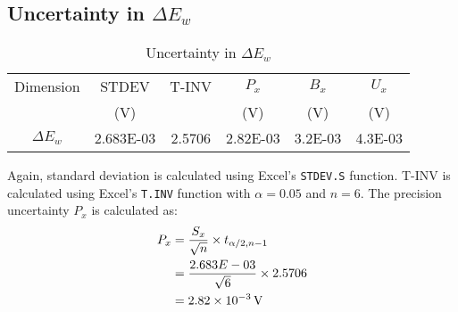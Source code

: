 \section{}

\subsection{Uncertainty in $\Delta E_w$}

\begin{table}[h]
    \centering
    \caption{Uncertainty in $\Delta E_w$}
    \label{tab:Q5UncertaintyDeltaEw}
    \begin{tabular}{cccccc}
        \toprule
        Dimension & STDEV & T-INV & $P_x$ & $B_x$ & $U_x$ \\
        & (V) & & (V) & (V) & (V) \\
        \midrule
        $\Delta E_w$ & 2.683E-03 & 2.5706 & 2.82E-03 & 3.2E-03 & 4.3E-03 \\
        \bottomrule
    \end{tabular}
\end{table}

Again, standard deviation is calculated using Excel's \texttt{STDEV.S} function. T-INV is calculated using Excel's \texttt{T.INV} function with $\alpha = 0.05$ and $n = 6$. 
The precision uncertainty $P_x$ is calculated as:
\begin{align*}
    P_x &= \frac{S_x}{\sqrt{n}} \times t_{\alpha/2, n-1} \\
    &= \frac{2.683E-03}{\sqrt{6}} \times 2.5706 \\
    &= \qty{2.82E-03}{V}
\end{align*}


